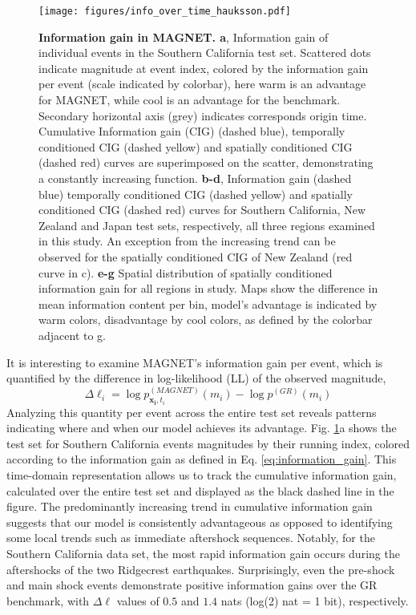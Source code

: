 \documentclass[pdflatex]{sn-jnl}
\begin{document}
    
\begin{figure}[h!]
    \centering
    \texttt{[image: figures/info\_over\_time\_hauksson.pdf]}
    \caption{
        \textbf{Information gain in MAGNET. a}, Information gain of individual events in the Southern California test set. Scattered dots indicate magnitude at event index, colored by the information gain per event (scale indicated by colorbar), here warm is an advantage for MAGNET, while cool is an advantage for the benchmark. Secondary horizontal axis (grey) indicates corresponds origin time. Cumulative Information gain (CIG) (dashed blue), temporally conditioned CIG (dashed yellow) and spatially conditioned CIG (dashed red) curves are superimposed on the scatter, demonstrating a constantly increasing function. \textbf{b-d}, Information gain (dashed blue) temporally conditioned CIG (dashed yellow) and spatially conditioned CIG (dashed red) curves for Southern California, New Zealand and Japan test sets, respectively, all three regions examined in this study. An exception from the increasing trend can be observed for the spatially conditioned CIG of New Zealand (red curve in c). \textbf{e-g} Spatial distribution of spatially conditioned information gain for all regions in study. Maps show the difference in mean information content per bin, model's advantage is indicated by warm colors, disadvantage by cool colors, as defined by the colorbar adjacent to g.
    }
    \label{fig:info_gain_over_time}
\end{figure}
    

It is interesting to examine MAGNET's information gain per event, which is quantified by the difference in log-likelihood (LL) of the observed magnitude, 
\begin{equation}
    \Delta \ell_i = \log{p_{\pmb{x_i}, t_i}^{(MAGNET)}(m_i)} - \log{p^{(GR)}(m_i)}
    \label{eq:information_gain}
\end{equation}
Analyzing this quantity per event across the entire test set reveals patterns indicating where and when our model achieves its advantage. Fig. \ref{fig:info_gain_over_time}a shows the test set for Southern California events magnitudes by their running index, colored according to the information gain as defined in Eq. \ref{eq:information_gain}. This time-domain representation allows us to track the cumulative information gain, calculated over the entire test set and displayed as the black dashed line in the figure.
The predominantly increasing trend in cumulative information gain suggests that our model is consistently advantageous as opposed to identifying some local trends such as immediate aftershock sequences. Notably, for the Southern California data set, the most rapid information gain occurs during the aftershocks of the two Ridgecrest earthquakes. Surprisingly, even the pre-shock and main shock events demonstrate positive information gains over the GR benchmark, with $\Delta \ell$ values of $0.5$ and $1.4$ nats (log(2) nat = 1 bit), respectively.
\end{document}
